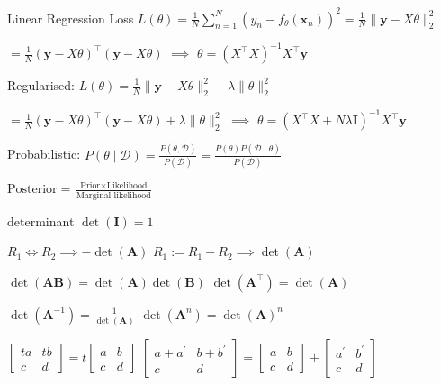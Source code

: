 \documentclass[UTF8,a4paper]{article}
\begin{document}
\begin{cheatsheetblock}{Linear Regression}
    Loss \hfill $L(\theta)=\frac{1}{N} \sum_{n=1}^N\left(y_n-f_\theta\left(\mathbf{x}_n\right)\right)^2=\frac{1}{N}\|\mathbf{y}-X \theta\|_2^2$

    $=\frac{1}{N}(\mathbf{y}-X \theta)^{\top}(\mathbf{y}-X \theta)$ \hfill $\implies$ \hfill $\theta=\left(X^{\top} X\right)^{-1} X^{\top} \mathbf{y}$

    Regularised: \hfill $L(\theta)=\frac{1}{N}\|\mathbf{y}-X \theta\|_2^2+\lambda\|\theta\|_2^2$

    $=\frac{1}{N}(\mathbf{y}-X \theta)^{\top}(\mathbf{y}-X \theta)+\lambda\|\theta\|_2^2$ \hfill $\implies$ \hfill $\theta=\left(X^{\top} X+N \lambda \mathbf{I}\right)^{-1} X^{\top} \mathbf{y}$

    Probabilistic: \hfill $P(\theta \mid \mathscr{D})=\frac{P(\theta, \mathscr{D})}{P(\mathscr{D})}=\frac{P(\theta) P(\mathscr{D} \mid \theta)}{P(\mathscr{D})}$

    \hfill $\text{Posterior} = \frac{\text{Prior} \times \text{Likelihood}}{\text{Marginal likelihood}}$
\end{cheatsheetblock}

\begin{cheatsheetblock}{determinant}
    $\det (\bm{I}) = 1$

    $R_1 \Leftrightarrow R_2 \implies -\det(\bm{A})$ \hfill $R_1 := R_1 - R_2 \implies \det(\bm{A})$

    $\det (\bm{A} \bm{B}) = \det (\bm{A}) \det (\bm{B})$ \hfill $\det (\bm{A}^{\top}) = \det (\bm{A})$

    $\det (\bm{A}^{-1}) = \frac{1}{\det (\bm{A})}$ \hfill $\det (\bm{A}^n) = \det (\bm{A})^n$

    $\begin{bmatrix}
            t a & t b \\
            c   & d
        \end{bmatrix}=t\begin{bmatrix}
            a & b \\
            c & d
        \end{bmatrix}$
    \hfill
    $\begin{bmatrix}
            a+a^{\prime} & b+b^{\prime} \\
            c            & d
        \end{bmatrix}=\begin{bmatrix}
            a & b \\
            c & d
        \end{bmatrix}+\begin{bmatrix}
            a^{\prime} & b^{\prime} \\
            c          & d
        \end{bmatrix}$
\end{cheatsheetblock}
\end{document}
